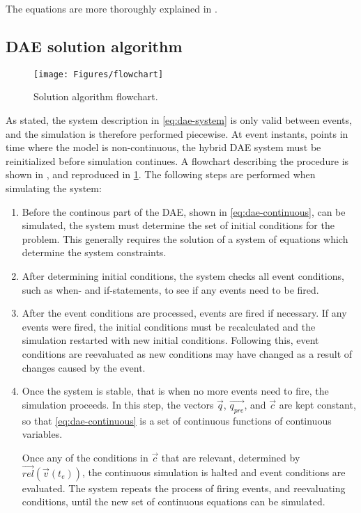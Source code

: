 \documentclass[\rootfolder/main.tex]{subfiles}
\begin{document}
The equations are more thoroughly explained in \cite{openmodelica.org:lundvall:sims:2005}.

\subsection{DAE solution algorithm}

\begin{figure}[H]
    \centering
    \texttt{[image: Figures/flowchart]}
    \caption{Solution algorithm flowchart.\label{fig:dae-flowchart}}
\end{figure}

As stated, the system description in \cref{eq:dae-system} is only valid between events, and the simulation is therefore performed piecewise.
At event instants, points in time where the model is non-continuous, the hybrid DAE system must be reinitialized before simulation continues.
A flowchart describing the procedure is shown in \cite{openmodelica.org:lundvall:sims:2005}, and reproduced in \cref{fig:dae-flowchart}.
The following steps are performed when simulating the system:

\begin{enumerate}
    \item Before the continous part of the DAE, shown in \cref{eq:dae-continuous}, can be simulated, the system must determine the set of initial conditions for the problem.
	This generally requires the solution of a system of equations which determine the system constraints.

    \item After determining initial conditions, the system checks all event conditions, such as when- and if-statements, to see if any events need to be fired.

    \item After the event conditions are processed, events are fired if necessary.
	If any events were fired, the initial conditions must be recalculated and the simulation restarted with new initial conditions.
	Following this, event conditions are reevaluated as new conditions may have changed as a result of changes caused by the event.

    \item Once the system is stable, that is when no more events need to fire, the simulation proceeds.
	In this step, the vectors $\vec{q}$, $\vec{q_{pre}}$, and $\vec{c}$ are kept constant, so that \cref{eq:dae-continuous} is a set of continuous functions of continuous variables.

	Once any of the conditions in $\vec{c}$ that are relevant, determined by $\vec{rel}(\vec{v}(t_{e}))$, the continuous simulation is halted and event conditions are evaluated.
	The system repeats the process of firing events, and reevaluating conditions, until the new set of continuous equations can be simulated.
\end{enumerate}
\end{document}
